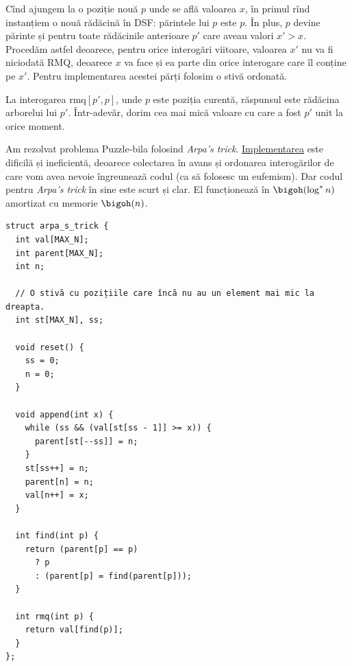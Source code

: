 Cînd ajungem la o poziție nouă $p$ unde se află valoarea $x$, în primul rînd instanțiem o nouă rădăcină în DSF: părintele lui $p$ este $p$. În plus, $p$ devine părinte și pentru toate rădăcinile anterioare $p'$ care aveau valori $x' > x$. Procedăm astfel deoarece, pentru orice interogări viitoare, valoarea $x'$ nu va fi niciodată RMQ, deoarece $x$ va face și ea parte din orice interogare care îl conține pe $x'$. Pentru implementarea acestei părți folosim o stivă ordonată.

La interogarea $\textrm{rmq}[p', p]$, unde $p$ este poziția curentă, răspunsul este rădăcina arborelui lui $p'$. Într-adevăr, dorim cea mai mică valoare cu care a fost $p'$ unit la orice moment.

Am rezolvat problema Puzzle-bila folosind \textit{Arpa's trick}. \href{https://kilonova.ro/submissions/781135}{Implementarea} este dificilă și ineficientă, deoarece colectarea în avans și ordonarea interogărilor de care vom avea nevoie îngreunează codul (ca să folosesc un eufemism). Dar codul pentru \textit{Arpa's trick} în sine este scurt și clar. El funcționează în $\bigoh(\log^{*} n)$ amortizat cu memorie $\bigoh(n)$.

\begin{verbatim}
struct arpa_s_trick {
  int val[MAX_N];
  int parent[MAX_N];
  int n;

  // O stivă cu pozițiile care încă nu au un element mai mic la dreapta.
  int st[MAX_N], ss;

  void reset() {
    ss = 0;
    n = 0;
  }

  void append(int x) {
    while (ss && (val[st[ss - 1]] >= x)) {
      parent[st[--ss]] = n;
    }
    st[ss++] = n;
    parent[n] = n;
    val[n++] = x;
  }

  int find(int p) {
    return (parent[p] == p)
      ? p
      : (parent[p] = find(parent[p]));
  }

  int rmq(int p) {
    return val[find(p)];
  }
};
\end{verbatim}
